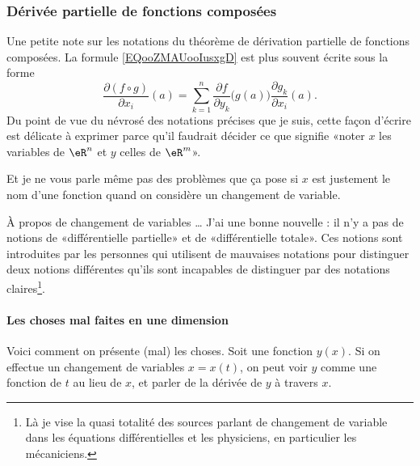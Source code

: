 \subsubsection{Dérivée partielle de fonctions composées}

\begin{normaltext}
	Une petite note sur les notations du théorème de dérivation partielle de fonctions composées. La formule \eqref{EQooZMAUooIusxgD} est plus souvent écrite sous la forme
	\begin{equation}
		\frac{ \partial (f\circ g) }{ \partial x_i }(a)=\sum_{k=1}^n\frac{ \partial f }{ \partial y_k }\big( g(a) \big)\frac{ \partial g_k }{ \partial x_i }(a).
	\end{equation}
	Du point de vue du névrosé des notations précises que je suis, cette façon d'écrire est délicate à exprimer parce qu'il faudrait décider ce que signifie «noter \( x\) les variables de \( \eR^n\) et \( y\) celles de \( \eR^m\)».

	Et je ne vous parle même pas des problèmes que ça pose si \( x\) est justement le nom d'une fonction quand on considère un changement de variable.
\end{normaltext}

\begin{normaltext}
	À propos de changement de variables \ldots{} J'ai une bonne nouvelle : il n'y a pas de notions de «différentielle partielle» et de «différentielle totale». Ces notions sont introduites par les personnes qui utilisent de mauvaises notations pour distinguer deux notions différentes qu'ils sont incapables de distinguer par des notations claires\footnote{Là je vise la quasi totalité des sources parlant de changement de variable dans les équations différentielles et les physiciens, en particulier les mécaniciens.}.
\end{normaltext}

\paragraph{Les choses mal faites en une dimension}

Voici comment on présente (mal) les choses. Soit une fonction \( y(x)\). Si on effectue un changement de variables \( x=x(t)\), on peut voir \( y\) comme une fonction de \( t\) au lieu de \( x\), et parler de la dérivée de \( y\) à travers \( x\).

